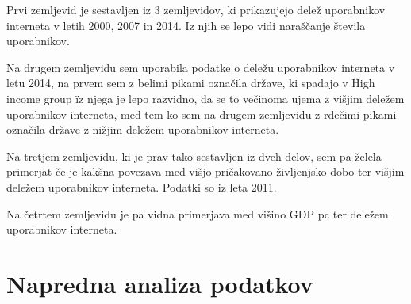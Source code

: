 \documentclass[11pt,a4paper]{article}
\begin{document}
Prvi zemljevid je sestavljen iz 3 zemljevidov, ki prikazujejo delež uporabnikov interneta v letih 2000, 2007 in 2014. Iz njih se lepo vidi naraščanje števila uporabnikov.

\newpage

\begin{figure}[htp] \centering{
}

\end{figure}  


\newpage

Na drugem zemljevidu sem uporabila podatke o deležu uporabnikov interneta v letu 2014, na prvem sem z belimi pikami označila države, ki spadajo v \"High income group \" iz njega je lepo razvidno, da se to večinoma ujema z višjim deležem uporabnikov interneta, med tem ko sem na drugem zemljevidu z rdečimi pikami označila države z nižjim deležem uporabnikov interneta.


\begin{figure}[h!] 
\begin{center}
 
 \end{center}
\end{figure}

\newpage

Na tretjem zemljevidu, ki je prav tako sestavljen iz dveh delov, sem pa želela primerjat če je kakšna povezava med višjo pričakovano življenjsko dobo ter višjim deležem uporabnikov interneta. Podatki so iz leta 2011. \\

\begin{figure}[h!]
\begin{center}
  
  \end{center}
\end{figure}

\newpage
Na četrtem zemljevidu je pa vidna primerjava med višino GDP pc ter deležem uporabnikov interneta.

\begin{figure}[h!]
\begin{center}
  
  \end{center}
\end{figure}

\newpage
\section{Napredna analiza podatkov}
\end{document}
